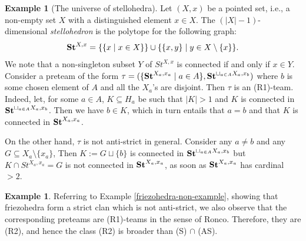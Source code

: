 \documentclass{article}
\theoremstyle{plain}
\theoremstyle{definition}
\newtheorem{example}[thm]{\sc Example}
\newcommand{\inc}{\subseteq}
\newcommand{\set}[1]{\{#1\}}
\newcommand{\setc}[2]{\set{#1 \mid #2}}
\newcommand{\hyper}[1]{{\bf #1}}
\begin{document}
\begin{example}[The universe of stellohedra]  \label{stellohedra-example}
Let $(X,x)$ be a pointed set, i.e., a non-empty set $X$ with a distinguished element $x\in X$. The $(|X|-1)$-dimensional  \emph{stellohedron} is the polytope for the following graph:
$$\hyper{St}^{X,x}=\set{\setc{x}{x\in X}} \cup\setc{\set{x,y}}{y\in X\setminus\set{x}}.$$
We note that a non-singleton  subset $Y$ of $St^{X,x}$ is connected if and only if $x \in Y$.
Consider a preteam of the form 
$\tau=(\setc{\hyper{St}^{X_a,x_a}}{a\in A},\hyper{St}^{\sqcup_{a\in A} X_a, x_b})$ 
where $b$ is some chosen element of $A$ and all the $X_a$'s are disjoint.  Then $\tau$ is an (R1)-team.  Indeed, let, for some $a\in A$, $K\inc H_a$  be such that  $|K|>1$ and $K$ is connected in $\hyper{St}^{\sqcup_{a\in A} X_a, x_b}$. 
Then we have $b\in K$, which in turn entails that  $a=b$  and that $K$ is connected in $\hyper{St}^{X_a,x_a}$.

On the other hand,  $\tau$ is not anti-strict in general. Consider any $a\neq b$  and any $G\inc X_a\setminus{\{x_a\}}$, Then $K:=G\sqcup\set{b}$ is connected in $\hyper{St}^{\sqcup_{a\in A} X_a, x_b}$ but $K\cap St^{X_a,x_a}=G$ is not connected in $\hyper{St}^{X_a,x_a}$, as soon as $\hyper{St}^{X_a,x_a}$ has cardinal $>2$.
\end{example}

\begin{example}\label{fgh}
Referring to Example \ref{friezohedra-non-example}, showing that friezohedra form a strict clan which is not anti-strict,  we  also observe that    the corresponding preteams are (R1)-teams in the sense of Ronco. Therefore, they are (R2), and hence the class (R2) is broader than (S) $\cap$ (AS).
\end{example}

 
 
\end{document}
